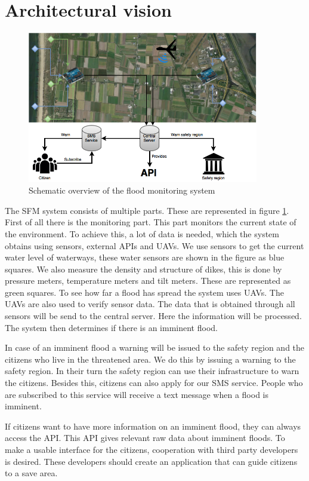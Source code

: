 \section{Architectural vision}
\label{sec:archvision}
\begin{figure}[H]
	\includegraphics[keepaspectratio=true,width=0.9\textwidth]{images/archVision.png}
	\caption{Schematic overview of the flood monitoring system}
	\label{fig:architectural-vision}
\end{figure}

The \gls{SFM} system consists of multiple parts. These are represented in figure \ref{fig:architectural-vision}. First of all there is the monitoring part. This part monitors the current state of the environment. To achieve this, a lot of data is needed, which the system obtains using sensors, external \gls{API}s and \gls{UAV}s. We use sensors to get the current water level of waterways, these water sensors are shown in the figure as blue squares. We also measure the density and structure of dikes, this is done by pressure meters, temperature meters and tilt meters. These are represented as green squares. To see how far a flood has spread the system uses UAVs. The UAVs are also used to verify sensor data. The data that is obtained through all sensors will be send to the central server. Here the information will be processed. The system then determines if there is an imminent flood.

In case of an imminent flood a warning will be issued to the safety region and the citizens who live in the threatened area. We do this by issuing a warning to the safety region. In their turn the safety region can use their infrastructure to warn the citizens. Besides this, citizens can also apply for our SMS service. People who are subscribed to this service will receive a text message when a flood is imminent.

If citizens want to have more information on an imminent flood, they can always access the API. This API gives relevant raw data about imminent floods. To make a usable interface for the citizens, cooperation with third party developers is desired. These developers should create an application that can guide citizens to a save area.
